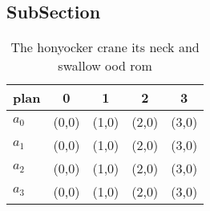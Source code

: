 \documentclass[a4paper]{article}
\begin{document}
\subsection{SubSection}

\begin{table}
\begin{adjustbox}{width=0.5\columnwidth}
\begin{tabular}{|l|l|l|l|l|}
\hline
\textbf{plan} & \multicolumn{1}{c|}{\textbf{0}} & \multicolumn{1}{c|}{\textbf{1}} & \multicolumn{1}{c|}{\textbf{2}} & \multicolumn{1}{c|}{\textbf{3}} \\ \hline
\textbf{$a_0$}  & (0,0) & (1,0) & (2,0) & (3,0) \\ \hline
\textbf{$a_1$}  & (0,0) & (1,0) & (2,0) & (3,0) \\ \hline
\textbf{$a_2$}  & (0,0) & (1,0) & (2,0) & (3,0) \\ \hline
\textbf{$a_3$}  & (0,0) & (1,0) & (2,0) & (3,0) \\ \hline
\end{tabular}
\end{adjustbox}
\caption{The honyocker crane its neck and swallow ood rom 
}
\end{table}
\end{document}
